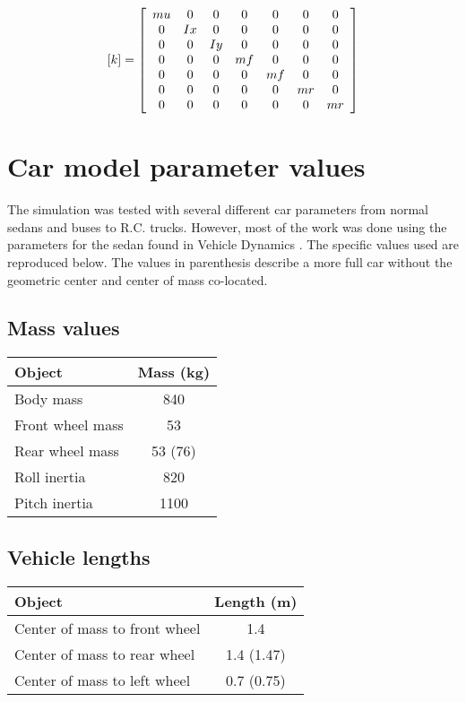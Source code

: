 \begin{equation*} \label{eq:full_car_k}
	[k] = \left[
		\begin{array}{c c c c c c c}
		mu & 0 & 0 & 0 & 0 & 0 & 0 \\
		0 & Ix & 0 & 0 & 0 & 0 & 0 \\
		0 & 0 & Iy & 0 & 0 & 0 & 0 \\
		0 & 0 & 0 & mf & 0 & 0 & 0 \\
		0 & 0 & 0 & 0 & mf & 0 & 0 \\
		0 & 0 & 0 & 0 & 0 & mr & 0 \\
		0 & 0 & 0 & 0 & 0 & 0 & mr \\
		\end{array}
	\right]
\end{equation*}

\section{Car model parameter values}
The simulation was tested with several different car parameters from normal sedans and buses to R.C. trucks. However, most of the work was done using the parameters for the sedan found in Vehicle Dynamics \cite{book:jazar}. The specific values used are reproduced below. The values in parenthesis describe a more full car without the geometric center and center of mass co-located.

\subsection{Mass values}
\begin{center}
\begin{tabular}{| l | c |}
\hline
Object & Mass (kg) \\
\hline
Body mass & 840 \\
Front wheel mass & 53 \\
Rear wheel mass & 53 (76) \\
Roll inertia & 820 \\
Pitch inertia & 1100 \\
\hline
\end{tabular}
\end{center}


\subsection{Vehicle lengths}
\begin{center}
\begin{tabular}{| l | c |}
\hline
Object & Length (m) \\
\hline
Center of mass to front wheel & 1.4 \\
Center of mass to rear wheel & 1.4 (1.47) \\
Center of mass to left wheel & 0.7 (0.75) \\
\hline
\end{tabular}
\end{center}

